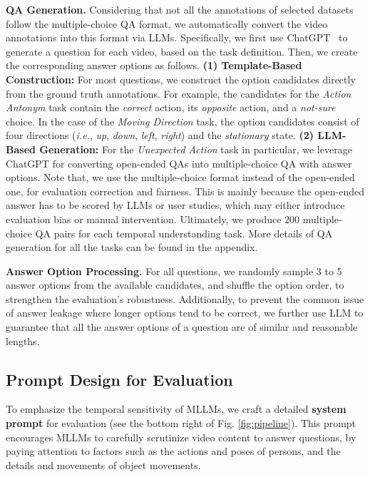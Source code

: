 \textbf{QA Generation.}
Considering that not all the annotations of selected datasets follow the multiple-choice QA format,
we automatically convert the video annotations into this format via LLMs.
Specifically,
we first use ChatGPT~\cite{chatgpt} to generate a question for each video,
based on the task definition.
Then,
we create the corresponding answer options as follows.
\textbf{(1) Template-Based Construction:} 
For most questions, 
we construct the option candidates directly from the ground truth annotations. 
For example,
the candidates for the \textit{Action Antonym} task contain
the \textit{correct} action, 
its \textit{opposite} action, 
and a \textit{not-sure} choice. 
In the case of the \textit{Moving Direction} task,
the option candidates consist of four directions (\textit{i.e.}, \textit{up}, \textit{down}, \textit{left}, \textit{right}) and the \textit{stationary} state.
\textbf{(2) LLM-Based Generation:}
For the \textit{Unexpected Action} task in particular, 
we leverage ChatGPT for converting open-ended QAs into multiple-choice QA with answer options.
Note that,
we use the multiple-choice format instead of the open-ended one,
for evaluation correction and fairness.
This is mainly because the open-ended answer has to be scored by LLMs or user studies,
which may either introduce evaluation bias or manual intervention.
Ultimately, 
we produce 200 multiple-choice QA pairs for each temporal understanding task.
More details of QA generation for all the tasks can be found in the appendix.
 

\textbf{Answer Option Processing.}
For all questions,
we randomly sample 3 to 5 answer options from the available candidates,
and shuffle the option order,
to strengthen the evaluation's robustness.
Additionally,
to prevent the common issue of answer leakage where longer options tend to be correct,
we further use LLM to guarantee that all the answer options of a question are of similar and reasonable lengths.

\subsection{Prompt Design for Evaluation}
\label{sec:evaluation}

To emphasize the temporal sensitivity of MLLMs,
we craft a detailed \textbf{system prompt} for evaluation (see the bottom right of Fig. \ref{fig:pipeline}). 
This prompt encourages MLLMs to carefully scrutinize video content to answer questions,
by paying attention to factors such as 
the actions and poses of persons, 
and the details and movements of object movements.

